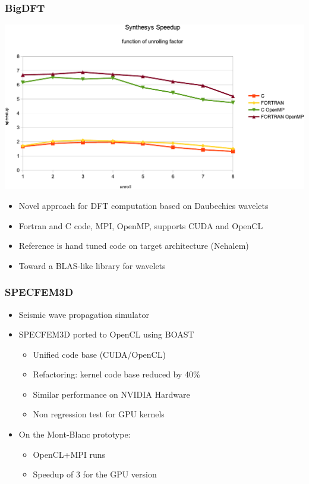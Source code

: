 \documentclass{beamer}
\begin{document}
\begin{frame}
  \frametitle{BigDFT}
  \begin{center}
    \includegraphics[scale=0.35]{Res_synthesis}
  \end{center}

 \begin{itemize}
  \item Novel approach for DFT computation based on Daubechies wavelets
  \item Fortran and C code, MPI, OpenMP, supports CUDA and OpenCL
   \item Reference is hand tuned code on target architecture (Nehalem)
    \item Toward a BLAS-like library for wavelets
  \end{itemize}
\end{frame}

\begin{frame}
  \frametitle{SPECFEM3D}

  \begin{itemize}
   \item Seismic wave propagation simulator
    \item SPECFEM3D ported to OpenCL using BOAST
    \begin{itemize}
      \item Unified code base (CUDA/OpenCL)
      \item Refactoring: kernel code base reduced by 40\%
      \item Similar performance on NVIDIA Hardware
      \item Non regression test for GPU kernels
    \end{itemize}
    \item On the Mont-Blanc prototype:
    \begin{itemize}
      \item OpenCL+MPI runs
      \item Speedup of 3 for the GPU version
    \end{itemize}
  \end{itemize}
\end{frame}
\end{document}
